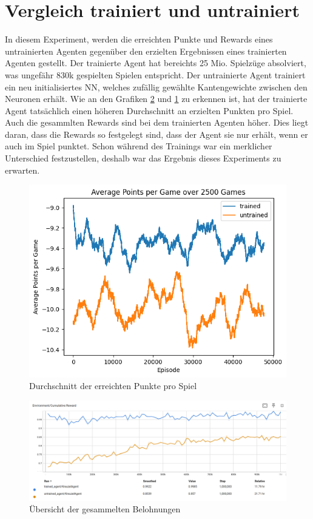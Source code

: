\section{Vergleich trainiert und untrainiert}
In diesem Experiment, werden die erreichten Punkte und Rewards eines untrainierten Agenten gegenüber den erzielten Ergebnissen eines trainierten Agenten gestellt. Der trainierte Agent hat bereichts 25 Mio. Spielzüge absolviert, was ungefähr 830k gespielten Spielen entspricht.
Der untrainierte Agent trainiert ein neu initialisiertes NN, welches zufällig gewählte Kantengewichte zwischen den Neuronen erhält.
Wie an den Grafiken \ref{fig:untrained_rewards} und \ref{fig:untrained_points} zu erkennen ist, hat der trainierte Agent tatsächlich einen höheren Durchschnitt an erzielten Punkten pro Spiel. Auch die gesammlten Rewards sind bei dem trainierten Agenten höher.
Dies liegt daran, dass die Rewards so festgelegt sind, dass der Agent sie nur erhält, wenn er auch im Spiel punktet.
Schon während des Trainings war ein merklicher Unterschied festzustellen, deshalb war das Ergebnis dieses Experiments zu erwarten.


\begin{figure}[!h]
    \centering
    \includegraphics[scale=0.6]{Bilder/points_trained_vs_untrained.png}
    \caption{Durchschnitt der erreichten Punkte pro Spiel }
    \label{fig:untrained_points}
\end{figure}
\begin{figure}[!h]
    \centering
    \includegraphics[scale=0.3]{Bilder/rewards_untrained.png}
    \caption{Übersicht der gesammelten Belohnungen}
    \label{fig:untrained_rewards}
\end{figure}

